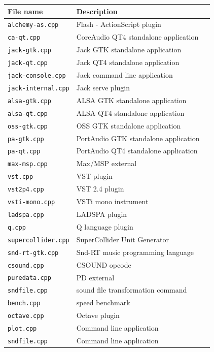 \documentclass[a4paper,10pt]{book}
\begin{document}
\begin{tabular}{|l|l|l|}
\hline
\textbf{File name}			& \textbf{Description}   \\
\hline
\texttt{alchemy-as.cpp} 	& Flash - ActionScript plugin \\
\texttt{ca-qt.cpp} 			& CoreAudio QT4 standalone application  \\
\texttt{jack-gtk.cpp} 		& Jack GTK standalone application  \\
\texttt{jack-qt.cpp} 		& Jack QT4 standalone application  \\
\texttt{jack-console.cpp} 	& Jack command line application  \\
\texttt{jack-internal.cpp} 	& Jack serve plugin  \\
\texttt{alsa-gtk.cpp} 		& ALSA GTK standalone application  \\
\texttt{alsa-qt.cpp} 		& ALSA QT4 standalone application  \\
\texttt{oss-gtk.cpp} 		& OSS GTK standalone application  \\
\texttt{pa-gtk.cpp} 		& PortAudio GTK standalone application  \\
\texttt{pa-qt.cpp} 			& PortAudio QT4 standalone application  \\
\hline
\texttt{max-msp.cpp} 		& Max/MSP external  \\
\texttt{vst.cpp} 			& VST plugin  \\
\texttt{vst2p4.cpp} 		& VST 2.4 plugin  \\
\texttt{vsti-mono.cpp} 		& VSTi mono instrument  \\
\texttt{ladspa.cpp} 		& LADSPA plugin  \\
\texttt{q.cpp} 				& Q language plugin  \\
\texttt{supercollider.cpp} 	& SuperCollider Unit Generator  \\
\texttt{snd-rt-gtk.cpp} 	& Snd-RT music programming language  \\
\texttt{csound.cpp} 		& CSOUND opcode  \\
\texttt{puredata.cpp} 		& PD external  \\
\hline
\texttt{sndfile.cpp} 		& sound file transformation command \\
\texttt{bench.cpp} 			& speed benchmark   \\
\texttt{octave.cpp} 		& Octave plugin   \\
\texttt{plot.cpp} 			& Command line application    \\
\texttt{sndfile.cpp} 		& Command line application    \\
\hline
\end{tabular}
\end{document}

